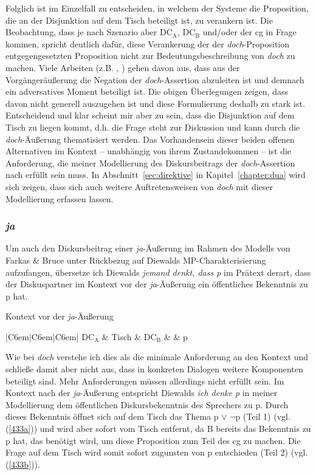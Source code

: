 Folglich ist im Einzelfall zu entscheiden, in welchem der Systeme die Proposition, die an der Disjunktion auf dem Tisch beteiligt ist, zu verankern ist. Die Beobachtung, dass je nach Szenario aber DC$_{\textrm{A}}$, DC$_\textrm{B}$ und/oder der cg in Frage kommen, spricht deutlich dafür, diese Verankerung der der \textit{doch}-Proposition entgegengesetzten Proposition nicht zur Bedeutungsbeschreibung von \textit{doch} zu machen. Viele Arbeiten (z.B. \citealt[71]{Doherty1985}, \citealt[83]{Ormelius-Sandblom1997}) gehen davon aus, dass aus der Vorgängeräußerung die Negation der \textit{doch}-Asser\-tion abzuleiten ist und demnach ein adversatives Moment beteiligt ist. Die obigen Überlegungen zeigen, dass davon nicht generell auszugehen ist und diese Formulierung deshalb zu stark ist. Entscheidend und klar scheint mir aber zu sein, dass die Disjunktion auf dem Tisch zu liegen kommt, d.h. die Frage steht zur Diskussion und kann durch die \textit{doch}-Äußerung thematisiert werden. Das Vorhandensein dieser beiden offenen Alternativen im Kontext – unabhängig von ihrem Zustandekommen – ist die Anforderung, die meiner Modellierung des Diskursbeitrags der \textit{doch}-Assertion nach erfüllt sein muss. In Abschnitt~\ref{sec:direktive} in Kapitel~\ref{chapter:dua} wird sich zeigen, dass sich auch weitere Auftretensweisen von \textit{doch} mit dieser Modellierung erfassen lassen.

\subsubsection{\textit{ja}}
\label{sec:ja}
Um auch den Diskursbeitrag einer \textit{ja}-Äußerung im Rahmen des Modells von Farkas \& Bruce unter Rückbezug auf Diewalds MP-Charakterisierung aufzufangen, übersetze ich Diewalds \textit{jemand denkt, dass p} im Prätext derart, dass der Diskuspartner im Kontext vor der \textit{ja}-Äußerung ein öffentliches Bekenntnis zu p hat.
\begin{exe}
	\ex\label{432} Kontext vor der \textit{ja}-Äußerung \\[-1em]	
 		\begin{tabular}[t]{|C{6em}|C{6em}|C{6em}|} 
 		\hline 	
   		$\textrm{DC}_{\textrm{A}}$ & {Tisch} & $\textrm{DC}_{\textrm{B}}$ \tabularnewline
  		\hline
   		{} & {} & p \tabularnewline
  		\hline      
   		 \tabularnewline   
  		 \hline
 		\end{tabular}
\end{exe}
Wie bei \textit{doch} verstehe ich dies als die minimale Anforderung an den Kontext und schließe damit aber nicht aus, dass in konkreten Dialogen weitere Komponenten beteiligt sind. Mehr Anforderungen müssen allerdings nicht erfüllt sein. Im Kontext nach der \textit{ja}-Äußerung entspricht Diewalds \textit{ich denke p} in meiner Mo\-dellierung dem öffentlichen Diskursbekenntnis des Sprechers zu p. Durch dieses Bekenntnis öffnet sich auf dem Tisch das Thema p $\vee$ $\neg$p (Teil 1) (vgl. (\ref{433a})) und wird aber sofort vom Tisch entfernt, da B bereits das Bekenntnis zu p hat, das benötigt wird, um diese Proposition zum Teil des cg zu machen. Die Frage auf dem Tisch wird somit sofort zugunsten von p entschieden (Teil 2) (vgl. (\ref{433b})).

